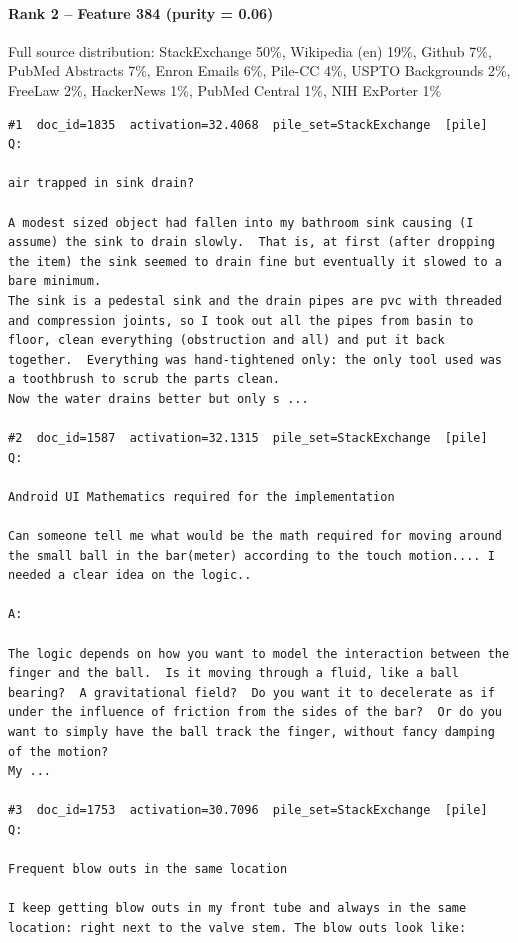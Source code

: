 \paragraph*{Rank 2 -- Feature 384 (purity = 0.06)}

Full source distribution: StackExchange 50\%, Wikipedia (en) 19\%, Github 7\%, PubMed Abstracts 7\%, Enron Emails 6\%, Pile-CC 4\%, USPTO Backgrounds 2\%, FreeLaw 2\%, HackerNews 1\%, PubMed Central 1\%, NIH ExPorter 1\%

\begin{verbatim}
#1  doc_id=1835  activation=32.4068  pile_set=StackExchange  [pile]
Q:

air trapped in sink drain?

A modest sized object had fallen into my bathroom sink causing (I assume) the sink to drain slowly.  That is, at first (after dropping the item) the sink seemed to drain fine but eventually it slowed to a bare minimum.  
The sink is a pedestal sink and the drain pipes are pvc with threaded and compression joints, so I took out all the pipes from basin to floor, clean everything (obstruction and all) and put it back together.  Everything was hand-tightened only: the only tool used was a toothbrush to scrub the parts clean.  
Now the water drains better but only s ...

#2  doc_id=1587  activation=32.1315  pile_set=StackExchange  [pile]
Q:

Android UI Mathematics required for the implementation

Can someone tell me what would be the math required for moving around the small ball in the bar(meter) according to the touch motion.... I needed a clear idea on the logic..

A:

The logic depends on how you want to model the interaction between the finger and the ball.  Is it moving through a fluid, like a ball bearing?  A gravitational field?  Do you want it to decelerate as if under the influence of friction from the sides of the bar?  Or do you want to simply have the ball track the finger, without fancy damping of the motion?
My ...

#3  doc_id=1753  activation=30.7096  pile_set=StackExchange  [pile]
Q:

Frequent blow outs in the same location

I keep getting blow outs in my front tube and always in the same location: right next to the valve stem. The blow outs look like:


\end{verbatim}
